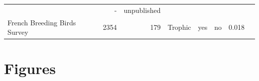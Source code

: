 \begin{longtable}[]{@{}lrrrrrrr@{}}
\begin{minipage}[t]{0.04\columnwidth}
\end{minipage} & \begin{minipage}[t]{0.06\columnwidth}\raggedleft\strut
-\strut
\end{minipage} & \begin{minipage}[t]{0.22\columnwidth}\raggedleft\strut
unpublished\strut
\end{minipage}\tabularnewline
\begin{minipage}[t]{0.15\columnwidth}\raggedright\strut
French Breeding Birds Survey\strut
\end{minipage} & \begin{minipage}[t]{0.07\columnwidth}\raggedleft\strut
2354\strut
\end{minipage} & \begin{minipage}[t]{0.07\columnwidth}\raggedleft\strut
179\strut
\end{minipage} & \begin{minipage}[t]{0.11\columnwidth}\raggedleft\strut
Trophic\strut
\end{minipage} & \begin{minipage}[t]{0.05\columnwidth}\raggedleft\strut
yes\strut
\end{minipage} & \begin{minipage}[t]{0.04\columnwidth}\raggedleft\strut
no\strut
\end{minipage} & \begin{minipage}[t]{0.06\columnwidth}\raggedleft\strut
0.018\strut
\end{minipage} & \begin{minipage}[t]{0.22\columnwidth}\raggedleft\strut
\citet{Gauzere2015}\strut
\end{minipage}\tabularnewline
\bottomrule
\end{longtable}

\newpage

\section{Figures}\label{figures}

